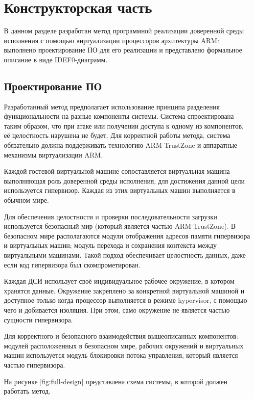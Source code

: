 \section{Конструкторская часть}

В данном разделе разработан метод программной реализации доверенной среды исполнения с помощью виртуализации процессоров архитектуры ARM: выполнено проектирование ПО для его реализации и представлено формальное описание в виде IDEF0-диаграмм.

\subsection{Проектирование ПО}

Разработанный метод предполагает использование принципа разделения функциональности на разные компоненты системы. Система спроектирована таким образом, что при атаке или получении доступа к одному из компонентов, её целостность нарушена не будет. Для корректной работы метода, система обязательно должна поддерживать технологию ARM TrustZone и аппаратные механизмы виртуализации ARM.

Каждой гостевой виртуальной машине сопоставляется виртуальная машина выполняющая роль доверенной среды исполнения, для достижения данной цели используется гипервизор. Каждая из этих виртуальных машин выполняется в обычном мире.

Для обеспечения целостности и проверки последовательности загрузки используется безопасный мир (который является частью ARM TrustZone). В безопасном мире располагаются модули отображения адресов памяти гипервизора и виртуальных машин; модуль перехода и сохранения контекста между виртуальными машинами. Такой подход обеспечивает целостность данных, даже если код гипервизора был скомпрометирован.

Каждая ДСИ использует своё индивидуальное рабочее окружение, в котором хранятся данные. Окружение закреплено за конкретной виртуальной машиной и доступное только когда процессор выполняется в режиме hypervisor, с помощью чего и добивается изоляция. При этом, само окружение не является частью сущности гипервизора.

Для корректного и безопасного взаимодействия вышеописанных компонентов: модулей расположенных в безопасном мире, рабочих окружений и виртуальных машин используется модуль блокировки потока управления, который является частью гипервизора.

На рисунке \ref{fig:full-design} представлена схема системы, в которой должен работать метод.

